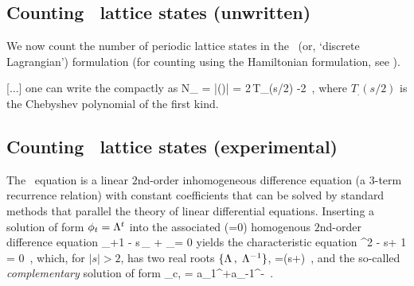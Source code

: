 \subsection{Counting \templatt\ lattice states (unwritten)}
\label{s:tempCatCount}

We now count the number of periodic lattice states  in
the \templatt\ (or, `discrete Lagrangian') formulation (for counting
using the Hamiltonian formulation, see ).

[...]
one can write
the {\HillDet} compactly as
\beq
N_\period{} = |\det(\jMorb)|
 = 2\,T_{\period{}}(s/2) -2
\,,
\label{POsChebyshev}
\eeq
where $T_{\period{}}(s/2)$ is the Chebyshev polynomial of the first kind.

\subsection{Counting \templatt\ lattice states (experimental)}
\label{s:tempCatCountTEMP}

The \templatt\ equation  is
a linear {$2$nd-order inhomogeneous difference} equation
(a $3$-term recurrence relation) with constant coefficients
that can be solved by standard methods that
parallel the theory of linear differential equations.
Inserting a solution of form $\phi_{t}=\Lambda^{t}$ into the
associated (\Ssym{\zeit}=0) homogenous {$2$nd-order difference equation}
\beq
\ssp_{\zeit+1} - {s}\,\ssp_{\zeit} + \ssp_{}= 0
yields the {characteristic equation}
\beq
\ExpaEig^{2} - {s}\ExpaEig + 1 = 0
\,,
which, for $|s|>2$, has two real roots
$\{\ExpaEig\,,\;\ExpaEig^{-1}\}$,
\beq
\ExpaEig
=(s+)
\,,
and the so-called \emph{complementary} solution of form
\beq
\ssp_{c,\zeit}  = a_1\ExpaEig^\zeit+a_{-1}\ExpaEig^{-\zeit}
\,.
\label{PC(2.3.4)}
\eeq

